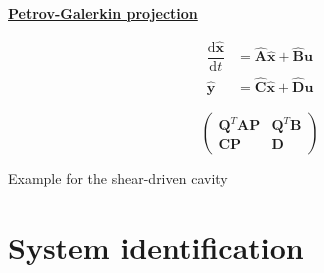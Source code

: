 \documentclass[aspectratio=169, usenames, dvipsnames]{beamer}
\begin{document}
\begin{frame}
  \vfill

  \centering
  \underline{\textbf{Petrov-Galerkin projection}}

  \bigskip

  \begin{overprint}
    \Large
    \[
    \begin{aligned}
      \dfrac{\mathrm{d} \hat{\bm{x}}}{\mathrm{d}t} & = \hat{\bm{A}} \hat{\bm{x}} + \hat{\bm{B}} \bm{u} \\
      \hat{\bm{y}} & = \hat{\bm{C}} \hat{\bm{x}} + \hat{\bm{D}} \bm{u}
    \end{aligned}
    \]

    \Large
    \[\left(
    \begin{array}{c|c}
      \bm{Q}^T \bm{A} \bm{P} & \bm{Q}^T \bm{B} \\
      \hline
      \bm{C} \bm{P} & \bm{D}
    \end{array}
    \right)
    \]

  \end{overprint}

  \vfill
\end{frame}

\begin{frame}
  Example for the shear-driven cavity
\end{frame}










\section{System identification}
\begin{frame}
  \sectionpage
\end{frame}

\begin{frame}
  \vfill

  \vfill
\end{frame}
\end{document}

